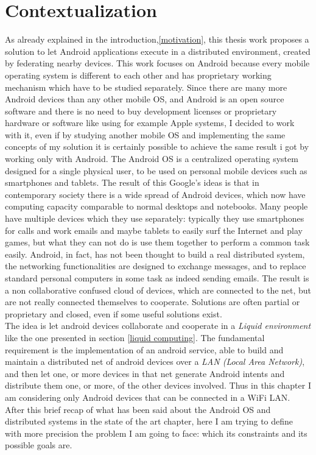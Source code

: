 \section{Contextualization} \label{facedProblem}
As already explained in the introduction,\ref{motivation}, this thesis work proposes a solution to let Android applications execute in a distributed environment, created by federating nearby devices. This work focuses on Android because every mobile operating system is different to each other and has proprietary working mechanism which have to be studied separately. Since there are many more Android devices than any other mobile OS, and Android is an open source software and there is no need to buy development licenses or proprietary hardware or software like using for example Apple systems, I decided to work with it, even if by studying another mobile OS and implementing the same concepts of my solution it is certainly possible to achieve the same result i got by working only with Android. 
The Android OS is a centralized operating system designed for a single physical user, to be used on personal mobile devices such as smartphones and tablets. The result of this Google's ideas is that in contemporary society there is a wide spread of Android devices, which now have computing capacity comparable to normal desktops and notebooks. Many people have multiple devices which they use separately: typically they use smartphones for calls and  work emails and maybe tablets to easily surf the Internet and play games, but what they can not do is use them together to perform a common task easily. Android, in fact, has not been thought to build a real distributed system, the networking functionalities are designed to exchange messages, and to replace standard personal computers in some task as indeed sending emails.
The result is a non collaborative confused cloud of devices, which are connected to the net, but are not really connected themselves to cooperate. Solutions are often partial or proprietary and closed, even if some useful solutions exist.\\
The idea is let android devices collaborate and cooperate in a \textit{Liquid environment} like the one presented in section \ref{liquid computing}. The fundamental requirement is the implementation of an android service, able to build and maintain a distributed net of android devices over a \textit{LAN (Local Area Network)}, and then let one, or more devices in that net generate Android intents and distribute them one, or more, of the other devices involved. Thus in this chapter I am considering only Android devices that can be connected in a WiFi LAN.\\
After this brief recap of what has been said about the Android OS and distributed systems in the state of the art chapter, here I am trying to define with more precision the problem I am going to face: which its constraints and its possible goals are.

